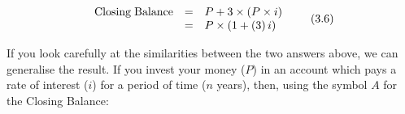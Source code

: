 \begin{enumerate}[noitemsep, label=\textbf{\arabic*}. ]
{\begin{equation}
    \begin{array}{ccc}\hfill \mathrm{Closing\; Balance}& =& P+3\ensuremath{\times}\left(P\ensuremath{\times}i\right)\hfill \\ & =& P\ensuremath{\times}\left(1+\left(3\right)i\right)\hfill \end{array}\tag{3.6}
      \end{equation}
    }
    \end{enumerate}
        \label{m39332*id69952}If you look carefully at the similarities between the two answers above, we can generalise the result. If you invest your money ($P$) in an account which pays a rate of interest (\begin{math}i\end{math}) for a period of time (\begin{math}n\end{math} years), then, using the symbol \begin{math}A\end{math} for the Closing Balance:\par 
        \label{m39332*uid34}\nopagebreak\noindent{}
